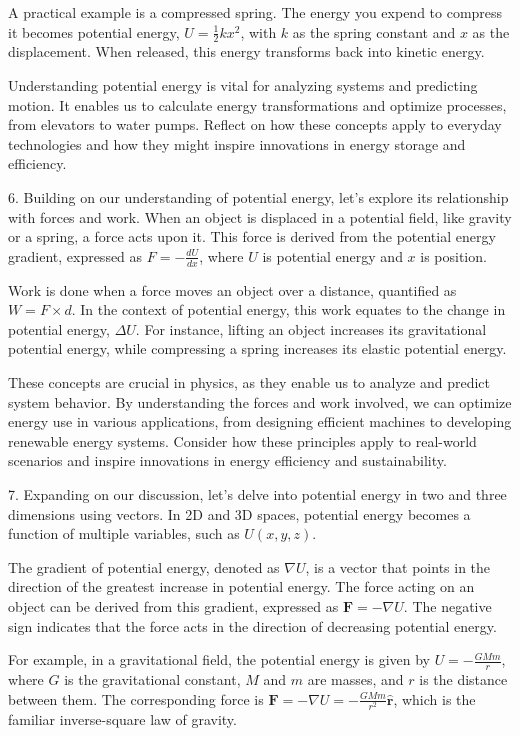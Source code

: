 \begin{tcolorbox}[size=title,opacityfill=0.05,breakable]
A practical example is a compressed spring. The energy you expend to compress it becomes potential energy, \( U = \frac{1}{2}kx^2 \), with \( k \) as the spring constant and \( x \) as the displacement. When released, this energy transforms back into kinetic energy.

Understanding potential energy is vital for analyzing systems and predicting motion. It enables us to calculate energy transformations and optimize processes, from elevators to water pumps. Reflect on how these concepts apply to everyday technologies and how they might inspire innovations in energy storage and efficiency.


6. Building on our understanding of potential energy, let's explore its relationship with forces and work. When an object is displaced in a potential field, like gravity or a spring, a force acts upon it. This force is derived from the potential energy gradient, expressed as \( F = -\frac{dU}{dx} \), where \( U \) is potential energy and \( x \) is position.

Work is done when a force moves an object over a distance, quantified as \( W = F \times d \). In the context of potential energy, this work equates to the change in potential energy, \( \Delta U \). For instance, lifting an object increases its gravitational potential energy, while compressing a spring increases its elastic potential energy.

These concepts are crucial in physics, as they enable us to analyze and predict system behavior. By understanding the forces and work involved, we can optimize energy use in various applications, from designing efficient machines to developing renewable energy systems. Consider how these principles apply to real-world scenarios and inspire innovations in energy efficiency and sustainability.

7. Expanding on our discussion, let's delve into potential energy in two and three dimensions using vectors. In 2D and 3D spaces, potential energy becomes a function of multiple variables, such as \( U(x, y, z) \).

The gradient of potential energy, denoted as \( \nabla U \), is a vector that points in the direction of the greatest increase in potential energy. The force acting on an object can be derived from this gradient, expressed as \( \mathbf{F} = -\nabla U \). The negative sign indicates that the force acts in the direction of decreasing potential energy.

For example, in a gravitational field, the potential energy is given by \( U = -\frac{GMm}{r} \), where \( G \) is the gravitational constant, \( M \) and \( m \) are masses, and \( r \) is the distance between them. The corresponding force is \( \mathbf{F} = -\nabla U = -\frac{GMm}{r^2} \hat{\mathbf{r}} \), which is the familiar inverse-square law of gravity.


\end{tcolorbox}
